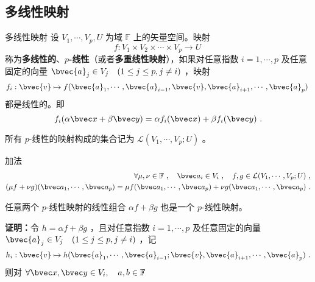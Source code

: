 

\subsection{多线性映射}
\begin{definition}{多线性映射}
设 $V_1,\cdots,V_p, U$ 为域 $\mathbb{F}$ 上的矢量空间。映射
\begin{equation}
f:V_1\times V_2\times\cdots\times V_p\rightarrow U~
\end{equation}
称为\textbf{多线性的}、\textbf{$p$-线性}（或者\textbf{多重线性映射}），如果对任意指数 $i=1,\cdots,p$ 及任意固定的向量 $\bvec{a}_j \in V_j\quad(1 \leq j \leq p,j\neq i)$ ，映射
\begin{equation}
f_i:\bvec{v}\mapsto f(\bvec{a}_1, \cdots, \bvec{a}_{i-1}, \bvec{v},\bvec{a}_{i+1}, \cdots,\bvec{a}_p)~
\end{equation}
都是线性的。即
\begin{equation}
f_i(\alpha\bvec x+\beta\bvec y)=\alpha f_i(\bvec x)+\beta f_i(\bvec y)~.
\end{equation}
\end{definition}
所有 $p$-线性的映射构成的集合记为 $\mathcal{L}(V_1,\cdots,V_p;U)$ 。
\begin{definition}{加法}
\begin{equation}
\begin{aligned}
\forall \mu,\nu\in\mathbb{F}~,\quad\bvec a_i\in V_i~,\quad f,g\in \mathcal{L}(V_1,\cdots,V_p;U)~,\\
(\mu f+\nu g)(\bvec a_1,\cdots,\bvec a_p)=\mu f(\bvec a_1,\cdots,\bvec a_p)+\nu g(\bvec a_1,\cdots,\bvec a_p)~.
\end{aligned}
\end{equation}
\end{definition}
\begin{theorem}{}\label{the_MulMap_1}
任意两个 $p$-线性映射的线性组合 $\alpha f+\beta g$ 也是一个 $p$-线性映射。
\end{theorem}
\textbf{证明：}令 $h=\alpha f+\beta g$ ，且对任意指数 $i=1,\cdots,p$ 及任意固定的向量 $\bvec{a}_j \in V_j\quad(1\leq j\leq p,j\neq i)$ ，记
\begin{equation}
h_i:\bvec{v}\mapsto h(\bvec{a}_1,\cdots,\bvec{a}_{i-1};\bvec{v},\bvec{a}_{i+1},\cdots,\bvec{a}_p)~.
\end{equation}
则对 $\forall \bvec x,\bvec y\in V_i,\quad a,b\in\mathbb{F}$
